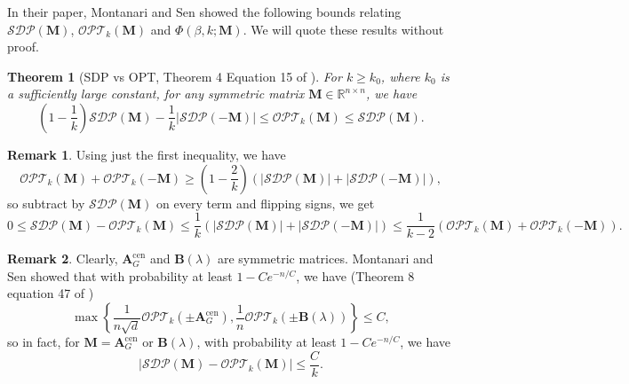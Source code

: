 \documentclass[11pt, titlepage]{article} %
\numberwithin{equation}{section}
\newtheorem{theorem}{Theorem}
\theoremstyle{definition}
\newtheorem{remark}{Remark}
\numberwithin{theorem}{section}
\numberwithin{lemma}{section}
\numberwithin{corollary}{section}
\numberwithin{proposition}{section}
\numberwithin{definition}{section}
\numberwithin{remark}{section}
\begin{document}
In their paper, Montanari and Sen showed the following bounds relating $\mathcal{SDP}(\bm{M})$, 
$\mathcal{OPT}_k(\bm{M})$ and $\Phi(\beta, k; \bm{M})$. We will quote these results without proof.
\begin{theorem}[SDP vs OPT, Theorem 4 Equation 15 of \cite{MS16}]
\label{thm:SDP.OPT}
For $k \geq k_0$, where $k_0$ is a sufficiently large constant, for any symmetric matrix 
$\bm{M} \in \mathbb{R}^{n \times n}$, we have
\[
\left(1-\frac{1}{k}\right) \mathcal{SDP}(\bm{M}) - \frac{1}{k} |\mathcal{SDP}(-\bm{M})|
\leq \mathcal{OPT}_k(\bm{M}) \leq \mathcal{SDP}(\bm{M}).
\] 
\end{theorem}
\begin{remark}
Using just the first inequality, we have
\[
\mathcal{OPT}_k (\bm{M}) + \mathcal{OPT}_k (-\bm{M}) \geq \left(1 - \frac{2}{k}\right) 
\left(|\mathcal{SDP}(\bm{M})| + |\mathcal{SDP}(-\bm{M})|\right),
\]
so subtract by $\mathcal{SDP}(\bm{M})$ on every term and flipping signs, we get
\[
0 \leq \mathcal{SDP}(\bm{M}) - \mathcal{OPT}_k(\bm{M}) 
\leq \frac{1}{k} \left(\left|\mathcal{SDP}(\bm{M})\right| + \left|\mathcal{SDP}(-\bm{M})\right|\right)
\leq \frac{1}{k-2} \left(\mathcal{OPT}_k(\bm{M}) + \mathcal{OPT}_k(-\bm{M})\right).
\]
\end{remark}
\begin{remark}
Clearly, $\bm{A}^\mathrm{cen}_{G}$ and $\bm{B}(\lambda)$ are symmetric matrices. 
Montanari and Sen showed that with probability at least $1 - Ce^{-n/C}$, we have
(Theorem 8 equation 47 of \cite{MS16})
\[
\max \left\{\frac{1}{n\sqrt{d}}\mathcal{OPT}_k(\pm \bm{A}^\mathrm{cen}_{G}), 
\frac{1}{n}\mathcal{OPT}_k(\pm \bm{B}(\lambda))\right\} \leq C,
\]
so in fact, for $\bm{M} = \bm{A}^\mathrm{cen}_{G}$ or $\bm{B}(\lambda)$, with probability 
at least $1 - Ce^{-n/C}$, we have
\[
\left|\mathcal{SDP}(\bm{M}) - \mathcal{OPT}_k(\bm{M})\right| \leq \frac{C}{k}.
\]
\end{remark}
\end{document}
